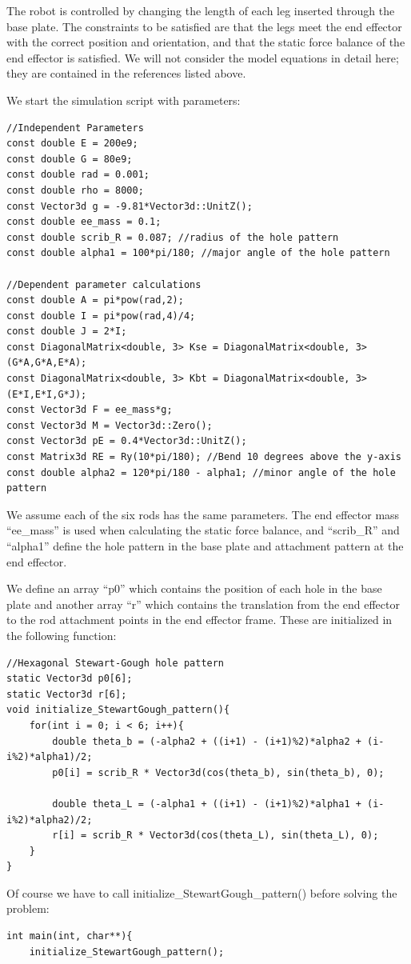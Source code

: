 \documentclass[12pt]{article}
\begin{document}
The robot is controlled by changing the length of each leg inserted through the base plate. The constraints to be satisfied are that the legs meet the end effector with the correct position and orientation, and that the static force balance of the end effector is satisfied. We will not consider the model equations in detail here; they are contained in the references listed above.

\newpage
We start the simulation script with parameters:
\begin{lstlisting}
//Independent Parameters
const double E = 200e9;
const double G = 80e9;
const double rad = 0.001;
const double rho = 8000;
const Vector3d g = -9.81*Vector3d::UnitZ();
const double ee_mass = 0.1;
const double scrib_R = 0.087; //radius of the hole pattern
const double alpha1 = 100*pi/180; //major angle of the hole pattern

//Dependent parameter calculations
const double A = pi*pow(rad,2);
const double I = pi*pow(rad,4)/4;
const double J = 2*I;
const DiagonalMatrix<double, 3> Kse = DiagonalMatrix<double, 3>(G*A,G*A,E*A);
const DiagonalMatrix<double, 3> Kbt = DiagonalMatrix<double, 3>(E*I,E*I,G*J);
const Vector3d F = ee_mass*g;
const Vector3d M = Vector3d::Zero();
const Vector3d pE = 0.4*Vector3d::UnitZ();
const Matrix3d RE = Ry(10*pi/180); //Bend 10 degrees above the y-axis
const double alpha2 = 120*pi/180 - alpha1; //minor angle of the hole pattern
\end{lstlisting}
We assume each of the six rods has the same parameters. The end effector mass ``ee\_mass'' is used when calculating the static force balance, and ``scrib\_R'' and ``alpha1'' define the hole pattern in the base plate and attachment pattern at the end effector.

We define an array ``p0'' which contains the position of each hole in the base plate and another array ``r'' which contains the translation from the end effector to the rod attachment points in the end effector frame. These are initialized in the following function:
\begin{lstlisting}
//Hexagonal Stewart-Gough hole pattern
static Vector3d p0[6];
static Vector3d r[6];
void initialize_StewartGough_pattern(){
    for(int i = 0; i < 6; i++){
        double theta_b = (-alpha2 + ((i+1) - (i+1)%2)*alpha2 + (i-i%2)*alpha1)/2;
        p0[i] = scrib_R * Vector3d(cos(theta_b), sin(theta_b), 0);

        double theta_L = (-alpha1 + ((i+1) - (i+1)%2)*alpha1 + (i-i%2)*alpha2)/2;
        r[i] = scrib_R * Vector3d(cos(theta_L), sin(theta_L), 0);
    }
}
\end{lstlisting}
Of course we have to call initialize\_StewartGough\_pattern() before solving the problem:
\begin{lstlisting}
int main(int, char**){
    initialize_StewartGough_pattern();
\end{lstlisting}
\end{document}
